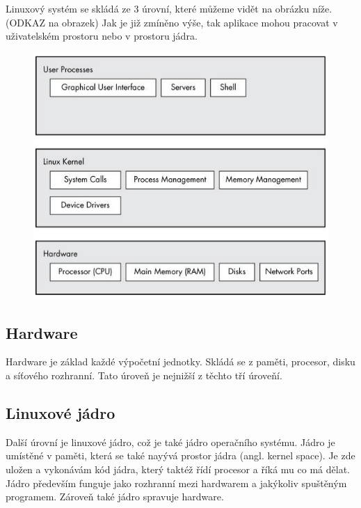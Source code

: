 Linuxový systém se skládá ze 3 úrovní, které můžeme vidět na obrázku níže.(ODKAZ na obrazek)
Jak je již zmíněno výše, tak aplikace mohou pracovat v uživatelském prostoru nebo v prostoru jádra.

\begin{figure}
    \centering
    \includegraphics{obrazky-figures/linux_structure.png}
    \caption{}
    \label{}
\end{figure}

\subsection{Hardware}
Hardware je základ každé výpočetní jednotky. Skládá se z paměti, procesor, disku a síťového rozhranní. Tato úroveň je nejnižší z těchto tří
úroveňí.

\subsection{Linuxové jádro}
Další úrovní je linuxové jádro, což je také jádro operačního systému. Jádro je umístěné v paměti, která se také nayývá prostor jádra
(angl. kernel space). Je zde uložen a vykonávám kód jádra, který taktéž řídí procesor a říká mu co má dělat.
Jádro především funguje jako rozhranní mezi hardwarem a jakýkoliv spuštěným programem. Zároveň také jádro spravuje hardware.

